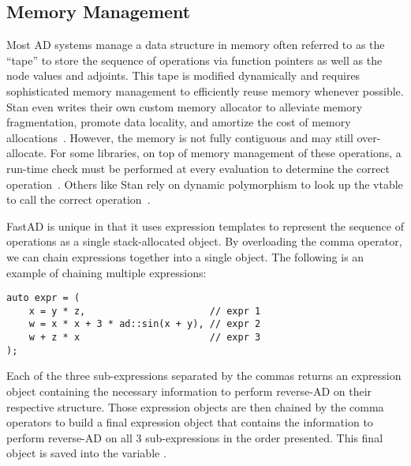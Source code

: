 \subsection{Memory Management}\label{ssec:memory}

Most AD systems manage a data structure in memory often referred to as the ``tape''
to store the sequence of operations via function pointers as well as the node values and adjoints.
This tape is modified dynamically and requires sophisticated memory management 
to efficiently reuse memory whenever possible.
Stan even writes their own custom memory allocator to alleviate memory fragmentation,
promote data locality, and amortize the cost of memory allocations~\cite{carpenter:2015}.
However, the memory is not fully contiguous and may still over-allocate.
For some libraries, on top of memory management of these operations,
a run-time check must be performed at every evaluation to determine the correct operation~\cite{bell:2020}.
Others like Stan rely on dynamic polymorphism to look up the vtable to call the correct operation~\cite{carpenter:2015}.

FastAD is unique in that it uses expression templates to represent the sequence of operations
as a single stack-allocated object.
By overloading the comma operator, we can chain expressions together into a single object.
The following is an example of chaining multiple expressions:
\begin{lstlisting}[style=customcpp]
auto expr = (
    x = y * z,                      // expr 1
    w = x * x + 3 * ad::sin(x + y), // expr 2
    w + z * x                       // expr 3
);
\end{lstlisting}
Each of the three sub-expressions separated by the commas returns an expression object
containing the necessary information to perform reverse-AD on their respective structure.
Those expression objects are then chained by the comma operators to build a final expression object
that contains the information to perform reverse-AD on all 3 sub-expressions in the order presented.
This final object is saved into the variable .

